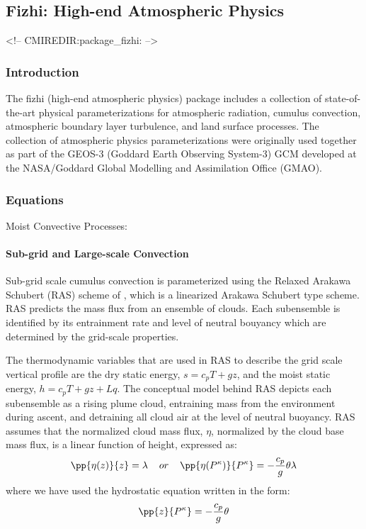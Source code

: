 \subsection{Fizhi: High-end Atmospheric Physics}
\label{sec:pkg:fizhi}
\begin{rawhtml}
<!-- CMIREDIR:package_fizhi: -->
\end{rawhtml}


\subsubsection{Introduction}
The fizhi (high-end atmospheric physics) package includes a collection of state-of-the-art
physical parameterizations for atmospheric radiation, cumulus convection, atmospheric
boundary layer turbulence, and land surface processes. The collection of atmospheric
physics parameterizations were originally used together as part of the GEOS-3
(Goddard Earth Observing System-3) GCM developed at the NASA/Goddard Global Modelling
and Assimilation Office (GMAO).

 
\subsubsection{Equations}

Moist Convective Processes:

\paragraph{Sub-grid and Large-scale Convection}
\label{sec:fizhi:mc}

Sub-grid scale cumulus convection is parameterized using the Relaxed Arakawa
Schubert (RAS) scheme of \cite{moorsz:92}, which is a linearized Arakawa Schubert
type scheme.  RAS predicts the mass flux from an ensemble of clouds.  Each subensemble is identified
by its entrainment rate and level of neutral bouyancy which are determined by the grid-scale properties.

The thermodynamic variables that are used in RAS to describe the grid scale vertical profile are
the dry static energy, $s=c_pT +gz$, and the moist static energy, $h=c_p T + gz + Lq$. 
The conceptual model behind RAS depicts each subensemble as a rising plume cloud, entraining 
mass from the environment during ascent, and detraining all cloud air at the level of neutral 
buoyancy. RAS assumes that the normalized cloud mass flux, $\eta$, normalized by the cloud base 
mass flux, is a linear function of height, expressed as:
\[
\pp{\eta(z)}{z} = \lambda \hspace{0.4cm}or\hspace{0.4cm} \pp{\eta(P^{\kappa})}{P^{\kappa}} = 
-{c_p \over {g}}\theta\lambda
\]
where we have used the hydrostatic equation written in the form:
\[
\pp{z}{P^{\kappa}} = -{c_p \over {g}}\theta
\]

